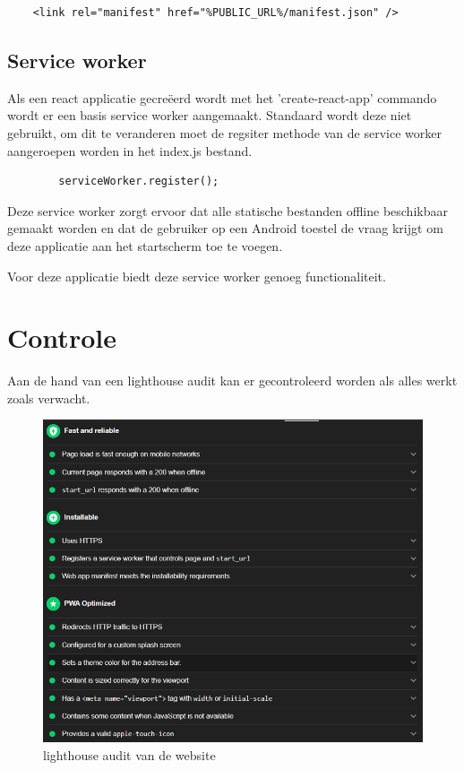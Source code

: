 \begin{lstlisting}
	<link rel="manifest" href="%PUBLIC_URL%/manifest.json" />
\end{lstlisting}
		
		
	\subsection{Service worker}
		
		Als een react applicatie gecreëerd wordt met het 'create-react-app' commando wordt er  een basis service worker aangemaakt. Standaard wordt deze niet gebruikt, om dit te veranderen moet de regsiter methode van de service worker aangeroepen worden in het index.js bestand.
		
\begin{lstlisting}
		serviceWorker.register();
\end{lstlisting}
		
		Deze service worker zorgt ervoor dat alle statische bestanden offline beschikbaar gemaakt worden en dat de gebruiker op een Android toestel de vraag krijgt om deze applicatie aan het startscherm toe te voegen.
		
		Voor deze applicatie biedt deze service worker genoeg functionaliteit.
		

\section{Controle}

	Aan de hand van een lighthouse audit kan er gecontroleerd worden als alles werkt zoals verwacht.
	
	\begin{figure}[H]
		\centering
		\includegraphics{./img/lighthouse_dart.png}{}
		\caption{lighthouse audit van de website}
	\end{figure}

